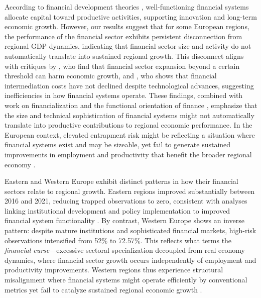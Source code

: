 \documentclass[a4paper,11pt,oneside]{article}
\begin{document}
According to financial development theories \citep{levine2005finance, demirguc2009finance}, well-functioning financial systems allocate capital toward productive activities, supporting innovation and long-term economic growth. However, our results suggest that for some European regions, the performance of the financial sector exhibits persistent disconnection from regional GDP dynamics, indicating that financial sector size and activity do not automatically translate into sustained regional growth. This disconnect aligns with critiques by \citet{arcand2015too}, who find that financial sector expansion beyond a certain threshold can harm economic growth, and \citet{philippon2015has}, who shows that financial intermediation costs have not declined despite technological advances, suggesting inefficiencies in how financial systems operate. These findings, combined with work on financialization and the functional orientation of finance \citep{dore2008financialization, sokol2017financialisation}, emphasize that the size and technical sophistication of financial systems might not automatically translate into productive contributions to regional economic performance. In the European context, elevated entrapment risk might be reflecting a situation where financial systems exist and may be sizeable, yet fail to generate sustained improvements in employment and productivity that benefit the broader regional economy \citep{wojcik2025finance, libich2022hero}.

Eastern and Western Europe exhibit distinct patterns in how their financial sectors relate to regional growth. Eastern regions improved substantially between 2016 and 2021, reducing trapped observations to zero, consistent with analyses linking institutional development and policy implementation to improved financial system functionality \citep{rodriguez2025banking, rodriguez2020institutions}. By contrast, Western Europe shows an inverse pattern: despite mature institutions and sophisticated financial markets, high-risk observations intensified from 52\% to 72.57\%. This reflects what \citet{sokol2017financialisation} terms the \emph{financial curse}---excessive sectoral specialization decoupled from real economy dynamics, where financial sector growth occurs independently of employment and productivity improvements. Western regions thus experience structural misalignment where financial systems might operate efficiently by conventional metrics yet fail to catalyze sustained regional economic growth \citep{cecchetti2015does, dore2008financialization}.
\end{document}

